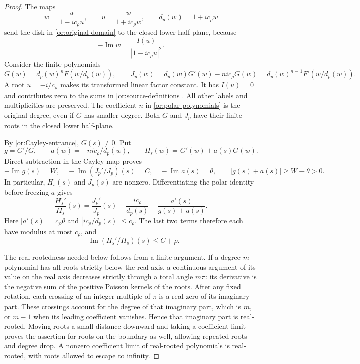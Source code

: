 \documentclass[11pt,reqno]{amsart}
\numberwithin{equation}{section}
\theoremstyle{definition}
\theoremstyle{remark}
\renewcommand{\Im}{\operatorname{Im}}
\begin{document}
\begin{proof}
The maps
\[
 w=\frac u{1-ic_\rho u},\qquad
 u=\frac w{1+ic_\rho w},\qquad d_p(w)=1+ic_\rho w
\]
send the disk in \eqref{or:original-domain} to the closed lower
half-plane, because
\[
       -\Im w=\frac{I(u)}{|1-ic_\rho u|^2}.
\]
Consider the finite polynomials
\begin{equation}\label{or:polar-polynomials}
 G(w)=d_p(w)^nF(w/d_p(w)),\qquad
 J_p(w)=d_p(w)G'(w)-nic_\rho G(w)
       =d_p(w)^{n-1}F'(w/d_p(w)).
\end{equation}
A root $u=-i/c_\rho$ makes its
transformed linear factor constant.  It has $I(u)=0$ and contributes
zero to the sums in \eqref{or:source-definitions}.  All other labels
and multiplicities are preserved.  The coefficient $n$ in
\eqref{or:polar-polynomials} is the original degree, even if $G$ has
smaller degree.  Both $G$ and $J_p$ have their finite roots in the
closed lower half-plane.

By \eqref{or:Cayley-entrance}, $G(s)\ne0$.  Put
\[
 g=G'/G,\qquad a(w)=-nic_\rho/d_p(w),\qquad
 H_s(w)=G'(w)+a(s)G(w).
\]
Direct subtraction in the Cayley map proves
\[
 -\Im g(s)=W,\quad -\Im(J_p'/J_p)(s)=C,\quad
 -\Im a(s)=\theta,
 \qquad |g(s)+a(s)|\ge W+\theta>0.
\]
In particular, $H_s(s)$ and $J_p(s)$ are nonzero.  Differentiating
the polar identity before freezing $a$ gives
\begin{equation}\label{or:frozen-polar}
 \frac{H_s'}{H_s}(s)
  =\frac{J_p'}{J_p}(s)-\frac{ic_\rho}{d_p(s)}
                      -\frac{a'(s)}{g(s)+a(s)}.
\end{equation}
Here $|a'(s)|=c_\rho\theta$ and $|ic_\rho/d_p(s)|\le c_\rho$.
The last two terms therefore each have modulus at most $c_\rho$,
and
\begin{equation}\label{or:frozen-upper}
                   -\Im(H_s'/H_s)(s)\le C+\rho.
\end{equation}

The real-rootedness needed below follows from a finite argument.
If a degree $m$ polynomial has all roots strictly below
the real axis, a continuous argument of its value on the real axis
decreases strictly through a total angle $m\pi$: its derivative is
the negative sum of the positive Poisson kernels of the roots.
After any fixed rotation, each crossing of an integer multiple of
$\pi$ is a real zero of its imaginary part.  These crossings account
for the degree of that imaginary part, which is $m$, or $m-1$ when
its leading coefficient vanishes.  Hence that imaginary part is
real-rooted.  Moving roots a small distance downward and taking a
coefficient limit proves the assertion for roots on the boundary as
well, allowing repeated roots and degree drop.  A nonzero coefficient
limit of real-rooted polynomials is real-rooted, with roots allowed to
escape to infinity.


\end{proof}
\end{document}
